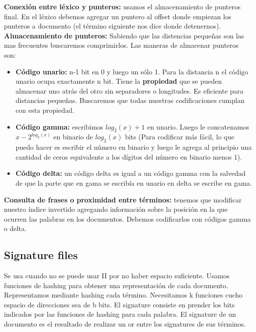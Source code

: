 \documentclass[titlepage,a4paper]{article}
\begin{document}
\textbf{Conexión entre léxico y punteros: } usamos el almacenamiento de punteros final. En el léxico debemos agregar un puntero al offset donde empiezan los punteros a documento (el término siguiente nos dice donde detenernos). \\

\textbf{Almacenamiento de punteros: } Sabiendo que las distencias pequeñas son las mas frecuentes buscaremos comprimirlos. Las maneras de almacenar punteros son: 
\begin{itemize}
\item \textbf{Código unario:} n-1 bit en 0 y luego un sólo 1. Para la distancia n el código unario ocupa exactamente n bit. Tiene la \textbf{propiedad} que se pueden almacenar uno atrás del otro sin separadores o longitudes. Es eficiente para distancias pequeñas. Buscaremos que todas nuestras codificaciones cumplan con esta propiedad. 
\item \textbf{Código gamma:} escribimos $log_2(x) +1$ en unario. Luego le concatenamos $x-2^{log_2(x)}$ en binario de $log_2(x)$ bits (Para codificar más fácil, lo que puedo hacer es escribir el número en binario y luego le agrega
al principio una cantidad de ceros equivalente a los dígitos del número en binario menos 1). 
\item \textbf{Código delta:} un código delta es igual a un código gamma con la salvedad de que la parte que en gama se escribía en unario en delta se escribe en gama. 
\end{itemize}

\textbf{Consulta de frases o proximidad entre términos:} tenemos que modificar nuestro índice invertido agregando información sobre la posición en la que ocurren las palabras en los documentos. Debemos codificarlos con códigos gamma o delta. \\

\subsection*{Signature files} 

Se usa cuando no se puede usar II por no haber espacio suficiente. Usamos funciones de hashing para obtener una representación de cada documento. Representamos mediante hashing cada término. Necesitamos k funciones cucho espacio de direcciones sea de b bits. El signature consiste en prender los bits indicados por las funciones de hashing para cada palabra. El signature de un documento es el resultado de realizar un or entre los signatures de sus términos.\\
\end{document}
